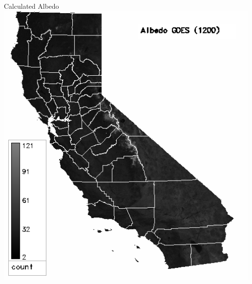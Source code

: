 \documentclass{beamer}
\begin{document}
\begin{frame}
\begin{columns}
\begin{block}{Calculated Albedo}
      \includegraphics[width=1\textwidth]{2005-01-06/p1200.png}
    \end{block}
  \end{columns}

\end{frame}
\end{document}
